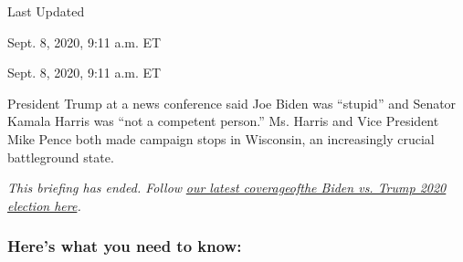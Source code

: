 Last Updated

Sept. 8, 2020, 9:11 a.m. ET

Sept. 8, 2020, 9:11 a.m. ET

President Trump at a news conference said Joe Biden was ``stupid'' and
Senator Kamala Harris was ``not a competent person.'' Ms. Harris and
Vice President Mike Pence both made campaign stops in Wisconsin, an
increasingly crucial battleground state.

\emph{This briefing has ended. Follow}
\href{https://www.nytimes3xbfgragh.onion/live/2020/08/19/us/dnc-convention-election}{\emph{our
latest
coverage}}\href{https://www.nytimes3xbfgragh.onion/live/2020/09/08/us/trump-vs-biden}{\emph{of}}\href{https://www.nytimes3xbfgragh.onion/live/2020/08/19/us/dnc-convention-election}{\emph{the
Biden vs. Trump 2020 election here}}\emph{.}

\hypertarget{heres-what-you-need-to-know}{%
\subsubsection{Here's what you need to
know:}\label{heres-what-you-need-to-know}}

